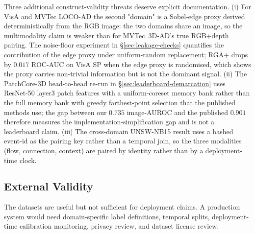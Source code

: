 \documentclass[10pt,conference]{IEEEtran}
\newcommand{\methodplus}{RGA+}
\begin{document}
Three additional construct-validity threats deserve explicit
documentation. (i) For VisA and MVTec LOCO-AD the second "domain" is a
Sobel-edge proxy derived deterministically from the RGB image: the two
domains share an image, so the multimodality claim is weaker than for
MVTec~3D-AD's true RGB+depth pairing. The noise-floor experiment in
§\ref{sec:leakage-checks} quantifies the contribution of the edge
proxy under uniform-random replacement; \methodplus{} drops by $0.017$
ROC-AUC on VisA SP when the edge proxy is randomised, which shows the
proxy carries non-trivial information but is not the dominant signal.
(ii) The PatchCore-3D head-to-head re-run in
§\ref{sec:leaderboard-demarcation} uses ResNet-50 layer3 patch features with
a uniform-coreset memory bank rather than the full memory bank with
greedy farthest-point selection that the published methods use; the
gap between our $0.735$ image-AUROC and the published $0.901$
therefore measures the implementation-simplification gap and is not a
leaderboard claim. (iii) The cross-domain UNSW-NB15 result uses a
hashed event-id as the pairing key rather than a temporal join, so
the three modalities (flow, connection, context) are paired by
identity rather than by a deployment-time clock.

\subsection{External Validity}
The datasets are useful but not sufficient for deployment claims. A
production system would need domain-specific label definitions,
temporal splits, deployment-time calibration monitoring, privacy
review, and dataset license review.
\end{document}
